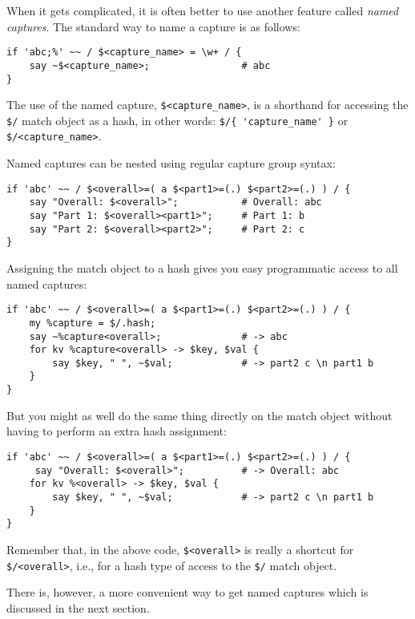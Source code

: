 When it gets complicated, it is often better to use another 
feature called \emph{named captures}. The standard way to 
name a capture is as follows:

\begin{verbatim}
if 'abc;%' ~~ / $<capture_name> = \w+ / {
    say ~$<capture_name>;                # abc
}
\end{verbatim} 

The use of the named capture, \verb'$<capture_name>', 
is a shorthand for accessing the \verb'$/' match object as 
a hash, in other words: \verb"$/{ 'capture_name' }" or 
\verb'$/<capture_name>'.

Named captures can be nested using regular capture group syntax:

\begin{verbatim}
if 'abc' ~~ / $<overall>=( a $<part1>=(.) $<part2>=(.) ) / {
    say "Overall: $<overall>";           # Overall: abc
    say "Part 1: $<overall><part1>";     # Part 1: b
    say "Part 2: $<overall><part2>";     # Part 2: c
}
\end{verbatim} 

Assigning the match object to a hash gives you easy programmatic 
access to all named captures:

\begin{verbatim}
if 'abc' ~~ / $<overall>=( a $<part1>=(.) $<part2>=(.) ) / {
    my %capture = $/.hash;    
    say ~%capture<overall>;              # -> abc
    for kv %capture<overall> -> $key, $val {
        say $key, " ", ~$val;            # -> part2 c \n part1 b
    }
}
\end{verbatim} 

But you might as well do the same thing directly on the 
match object without having to perform an extra hash 
assignment:

\begin{verbatim}
if 'abc' ~~ / $<overall>=( a $<part1>=(.) $<part2>=(.) ) / {
     say "Overall: $<overall>";          # -> Overall: abc
    for kv %<overall> -> $key, $val {
        say $key, " ", ~$val;            # -> part2 c \n part1 b
    }
}
\end{verbatim}

Remember that, in the above code, \verb'$<overall>' is 
really a shortcut for  \verb'$/<overall>', i.e., for a 
hash type of access to the \verb'$/' match object.

There is, however, a more convenient way to get named 
captures which is discussed in the next section.

